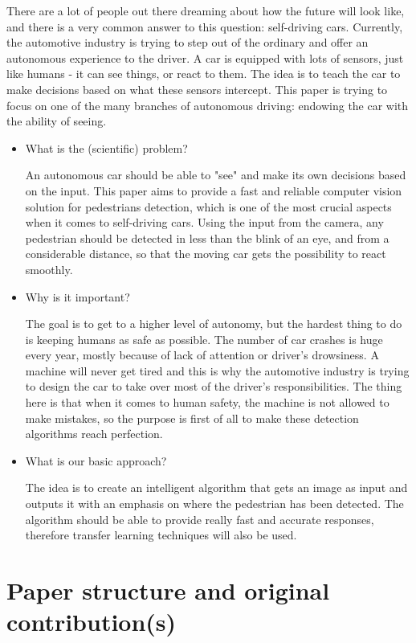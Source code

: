 \documentclass[runningheads,a4paper,11pt]{report}
\begin{document}
There are a lot of people out there dreaming about how the future will look like, and there is a very common answer to this question: self-driving cars. Currently, the automotive industry is trying to step out of the ordinary and offer an autonomous experience to the driver. A car is equipped with lots of sensors, just like humans - it can see things, or react to them. The idea is to teach the car to make decisions based on what these sensors intercept. This paper is trying to focus on one of the many branches of autonomous driving: endowing the car with the ability of seeing.
\begin{itemize}
	\item What is the (scientific) problem? 
	
	An autonomous car should be able to "see" and make its own decisions based on the input. This paper aims to provide a fast and reliable computer vision solution for pedestrians detection, which is one of the most crucial aspects when it comes to self-driving cars. Using the input from the camera, any pedestrian should be detected in less than the blink of an eye, and from a considerable distance, so that the moving car gets the possibility to react smoothly.
	\item Why is it important? 
	
	The goal is to get to a higher level of autonomy, but the hardest thing to do is keeping humans as safe as possible. The number of car crashes is huge every year, mostly because of lack of attention or driver's drowsiness. A machine will never get tired and this is why the automotive industry is trying to design the car to take over most of the driver's responsibilities. The thing here is that when it comes to human safety, the machine is not allowed to make mistakes, so the purpose is first of all to make these detection algorithms reach perfection.
	  
	\item What is our basic approach? 
	
	The idea is to create an intelligent algorithm that gets an image as input and outputs it with an emphasis on where the pedestrian has been detected. The algorithm should be able to provide really fast and accurate responses, therefore transfer learning techniques will also be used.  
\end{itemize}



\section{Paper structure and original contribution(s)}
\label{section:structure}
\end{document}
